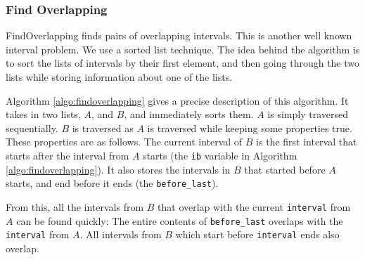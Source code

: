 \documentclass[12pt,twoside]{reedthesis}
\begin{document}
		\subsubsection{Find Overlapping}
		
			FindOverlapping finds pairs of overlapping intervals. This is another well known interval problem. We use a sorted list technique. 
			The idea behind the algorithm is to sort the lists of intervals by their first element, and then going through the two lists while storing information about one of the lists. 
			
			Algorithm \ref{algo:findoverlapping} gives a precise description of this algorithm. It takes in two lists, $A$, and $B$, and immediately sorts them. $A$ is simply traversed sequentially. $B$ is traversed as $A$ is traversed while keeping some properties true. These properties are as follows. The current interval of $B$ is the first interval that starts after the interval from $A$ starts (the \texttt{ib} variable in Algorithm \ref{algo:findoverlapping}). It also stores the intervals in $B$ that started before $A$ starts, and end before it ends (the \texttt{before\_last}).
			
		 	From this, all the intervals from $B$ that overlap with the current \texttt{interval} from $A$ can be found quickly: The entire contents of \texttt{before\_last} overlaps with the \texttt{interval} from $A$. All intervals from $B$ which start before \texttt{interval} ends also overlap.
			
			
                    
\end{document}

